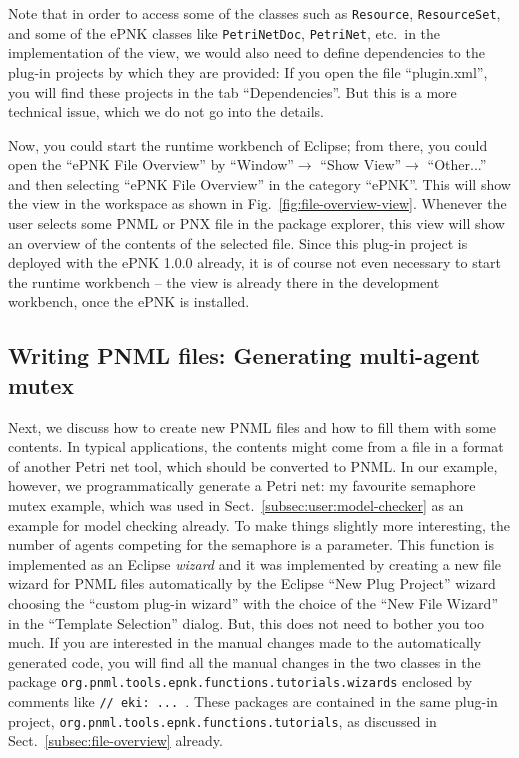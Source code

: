Note that in order to access some of the classes such as {\tt Resource},
{\tt Resource\optsep{}Set}, and some of the ePNK classes like {\tt PetriNetDoc},
{\tt PetriNet}, etc.\ in the implementation of the view, we would also need to
define dependencies to the plug-in projects by which they are provided: If you
open the file ``plugin.xml'', you will find these projects in the tab ``Dependencies''.  But
this is a more technical issue, which we do not go into the details.

Now, you could start the runtime workbench of Eclipse; from there, you could open the
``ePNK File Overview'' by ``Window''$\rightarrow$ ``Show
View''$\rightarrow$ ``Other...'' and then selecting ``ePNK File Overview''
in the category ``ePNK''. This will show the view in the workspace as shown
in Fig.~\ref{fig:file-overview-view}. Whenever the user selects some
PNML or PNX file in the package explorer, this view will show an overview
of the contents of the selected file. Since this plug-in project is deployed
with the ePNK 1.0.0 already, it is of course not even necessary to start the
runtime workbench -- the view is already there in the development workbench,
once the ePNK is installed.


\subsection{Writing PNML files: Generating multi-agent mutex}
\label{subsect:multi-agent}

Next, we discuss how to create new PNML files and how to fill them
with some contents.
In typical applications, the contents might come from a file in a format of
another Petri net tool, which should be converted to PNML. In our example,
however, we programmatically generate a Petri net: my favourite semaphore mutex
example, which was used in Sect.~\ref{subsec:user:model-checker} as an
example for model checking already.
To make things slightly more interesting, the number of agents competing for the
semaphore is a parameter.  This function is implemented as an Eclipse
\emph{wizard}%
and it was implemented by creating a new file wizard for PNML files
automatically by the Eclipse ``New Plug Project'' wizard choosing the
``custom plug-in wizard'' with the choice of the ``New File Wizard'' in
the ``Template Selection'' dialog. But, this does not need to bother you too
much. If you are interested in the manual changes made to the automatically
generated code, you will find all the manual changes in the two classes
in the package {\tt org.pnml.tools.epnk.functions.tutorials.wizards} enclosed
by comments like {\tt // eki: ... }. These packages are contained in the
same plug-in project, 
{\tt org.pnml.tools.epnk.functions.tutorials},
as discussed in Sect.~\ref{subsec:file-overview} already.

